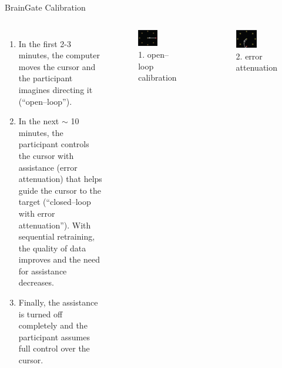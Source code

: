 \documentclass[aspectratio=169,19pt,xetex,handout]{beamer}
\begin{document}
\begin{frame}{BrainGate Calibration}
\begin{columns}
\begin{enumerate}
    \item In the first 2-3 minutes, the computer moves the cursor and the participant imagines directing it (``open--loop'').
    \item In the next $\sim$ 10 minutes, the participant controls the cursor with assistance (error attenuation) that helps guide the cursor to the target (``closed--loop with error attenuation'').  With sequential retraining, the quality of data improves and the need for assistance decreases.
    \item Finally, the assistance is turned off completely and the participant assumes full control over the cursor.
    \end{enumerate}
\begin{figure}
\includegraphics[width=0.5\textwidth]{bg_calibration1}
\caption{1. open--loop calibration}
\end{figure}
\begin{figure}
\includegraphics[width=0.5\textwidth]{bg_calibration2}
\caption{2. error attenuation}
\end{figure}
\end{columns}
\end{frame}
\end{document}
